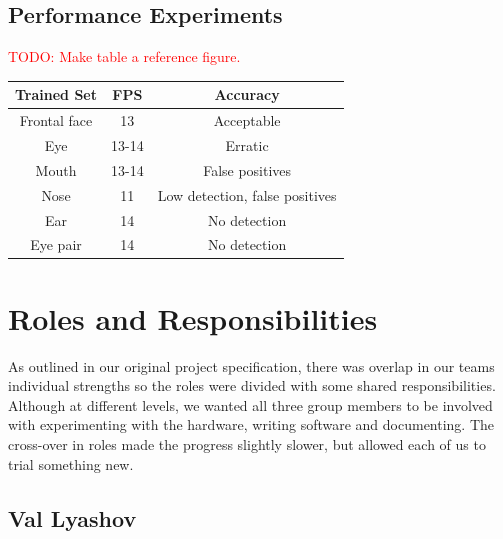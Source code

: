 \documentclass[11pt,a4paper,titlepage]{report}
\begin{document}
\subsection{Performance Experiments}



\textcolor{red}{TODO: Make table a reference figure.}


\begin{center}
\begin{table}
\begin{tabular}{|c|c|c|}
    \hline
    \textbf{Trained Set} & \textbf{FPS} & \textbf{Accuracy} \\ \hline
    
    Frontal face & 13 & Acceptable \\ \hline
    
    Eye & 13-14 & Erratic \\ \hline
    
    Mouth & 13-14 & False positives \\ \hline
    
    Nose & 11 & Low detection, false positives \\ \hline
    
    Ear & 14 & No detection \\ \hline
    
    Eye pair & 14 & No detection \\ \hline

\end{tabular}
\end{table}
\end{center}




\section{Roles and Responsibilities}

As outlined in our original project specification, there was overlap in our teams individual strengths so the roles were divided with some shared responsibilities. Although at different levels, we wanted all three group members to be involved with experimenting with the hardware, writing software and documenting. The cross-over in roles made the progress slightly slower, but allowed each of us to trial something new.

\subsection{Val Lyashov}
\end{document}
